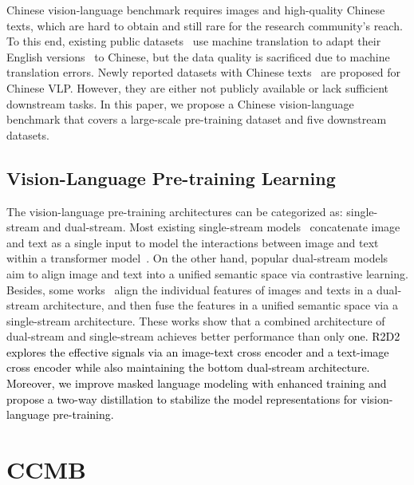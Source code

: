\documentclass[sigconf]{acmart}
\def\mmcr{\textcolor{black}}
\def\databone{benchmark}
\begin{document}
Chinese vision-language \databone{} requires images and high-quality Chinese texts, which are hard to obtain and still rare for the research community's reach.
To this end, existing public datasets~\cite{flickr30k-cn, coco-cn} use machine translation to adapt their English versions~\cite{cococaption,Flickr} to Chinese, but the data quality is sacrificed due to machine translation errors.
Newly reported datasets with Chinese texts~\cite{wenlan2,gu2022wukong,M6} are proposed for Chinese VLP. However, they are either not publicly available or lack sufficient downstream tasks. In this paper, we propose a Chinese vision-language \databone{} that covers a large-scale pre-training dataset and five downstream datasets. 









\subsection{Vision-Language Pre-training Learning}

The vision-language pre-training architectures can be categorized as: single-stream and dual-stream.
Most existing single-stream models~\cite{uniter,unicodervl,visualbert,12in1,imagebert} concatenate image and text as a single input to model the interactions between image and text within a transformer model~\cite{Transformer}.
On the other hand, popular dual-stream models~\cite{vse,scaling,visualitm,ViLBERT,CLIP,ALIGN,chinese-clip} aim to align image and text into a unified semantic space via contrastive learning.
Besides, some works~\cite{BLIP,ALBEF,FLAVA} align the individual features of images and texts in a dual-stream architecture, and then fuse the features in a unified semantic space via a single-stream architecture.
These works show that a combined architecture of dual-stream and single-stream achieves better performance than only \mmcr{one. R2D2 explores the effective signals via an image-text cross encoder and a text-image cross encoder while also maintaining the bottom dual-stream architecture. Moreover, we improve masked language modeling with enhanced training and 
propose a two-way distillation to stabilize the model representations for vision-language pre-training.}







\section{CCMB}
\label{Collected_Dataset}
\end{document}

